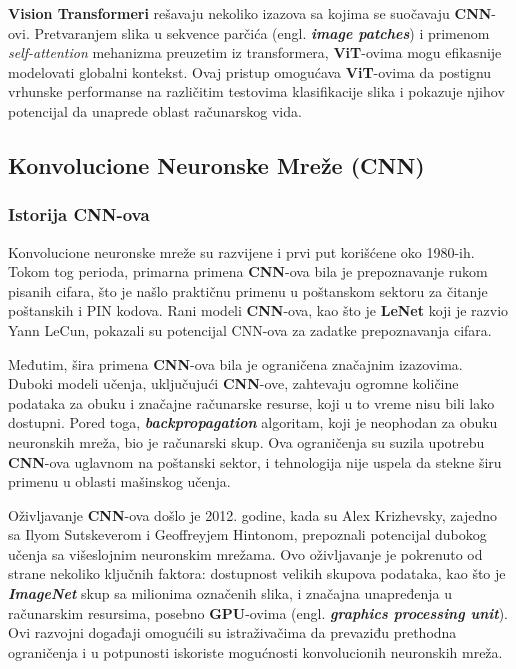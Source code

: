 \documentclass[12pt]{article}
\begin{document}
   \textbf{Vision Transformeri} rešavaju nekoliko izazova sa kojima se suočavaju \textbf{CNN}-ovi. 
   Pretvaranjem slika u sekvence parčića (engl. \textbf{\textit{image patches}}) i primenom \textit{self-attention} mehanizma preuzetim iz transformera, 
   \textbf{ViT}-ovima mogu efikasnije modelovati globalni kontekst. 
   Ovaj pristup omogućava \textbf{ViT}-ovima da postignu vrhunske performanse na različitim  
   testovima klasifikacije slika i pokazuje njihov potencijal da unaprede oblast računarskog vida.

   \subsection{Konvolucione Neuronske Mreže (CNN)}
   \subsubsection{Istorija CNN-ova}
   Konvolucione neuronske mreže su razvijene 
   i prvi put korišćene oko 1980-ih. Tokom tog perioda, primarna primena 
   \textbf{CNN}-ova bila je prepoznavanje rukom pisanih cifara, što je našlo 
   praktičnu primenu u poštanskom sektoru za čitanje poštanskih i PIN kodova. 
   Rani modeli \textbf{CNN}-ova, kao što je \textbf{LeNet} \cite{lenet} koji je razvio Yann LeCun, pokazali su 
   potencijal CNN-ova za zadatke prepoznavanja cifara.

   Međutim, šira primena \textbf{CNN}-ova bila je ograničena značajnim izazovima. 
   Duboki modeli učenja, uključujući \textbf{CNN}-ove, zahtevaju ogromne količine 
   podataka za obuku i značajne računarske resurse, koji u to vreme nisu 
   bili lako dostupni. Pored toga, \textbf{\textit{backpropagation}} algoritam, 
   koji je neophodan za obuku neuronskih mreža, bio je računarski skup. 
   Ova ograničenja su suzila upotrebu \textbf{CNN}-ova uglavnom na poštanski sektor, 
   i tehnologija nije uspela da stekne širu primenu u oblasti mašinskog učenja.

   Oživljavanje \textbf{CNN}-ova došlo je 2012. godine, kada su Alex Krizhevsky, zajedno 
   sa Ilyom Sutskeverom i Geoffreyjem Hintonom, prepoznali potencijal dubokog 
   učenja sa višeslojnim neuronskim mrežama. Ovo oživljavanje je pokrenuto od strane nekoliko 
   ključnih faktora: dostupnost velikih skupova podataka, kao što je \textbf{\textit{ImageNet}} \cite{imagenet} skup sa 
   milionima označenih slika, i značajna unapređenja u računarskim resursima, posebno \textbf{GPU}-ovima 
   (engl. \textbf{\textit{graphics processing unit}}). Ovi razvojni događaji omogućili su istraživačima da prevaziđu prethodna ograničenja i u 
   potpunosti iskoriste mogućnosti konvolucionih neuronskih mreža.
\end{document}
